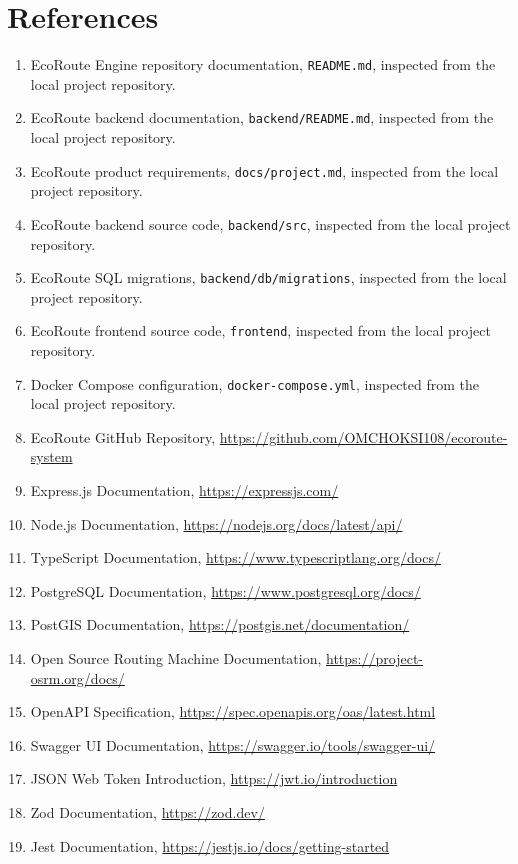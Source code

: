 \documentclass[12pt,a4paper]{report}
\begin{document}
\chapter*{References}
\footnotesize
\begin{enumerate}
\item EcoRoute Engine repository documentation, \texttt{README.md}, inspected from the local project repository.
\item EcoRoute backend documentation, \texttt{backend/README.md}, inspected from the local project repository.
\item EcoRoute product requirements, \texttt{docs/project.md}, inspected from the local project repository.
\item EcoRoute backend source code, \texttt{backend/src}, inspected from the local project repository.
\item EcoRoute SQL migrations, \texttt{backend/db/migrations}, inspected from the local project repository.
\item EcoRoute frontend source code, \texttt{frontend}, inspected from the local project repository.
\item Docker Compose configuration, \texttt{docker-compose.yml}, inspected from the local project repository.
\item EcoRoute GitHub Repository, \url{https://github.com/OMCHOKSI108/ecoroute-system}
\item Express.js Documentation, \url{https://expressjs.com/}
\item Node.js Documentation, \url{https://nodejs.org/docs/latest/api/}
\item TypeScript Documentation, \url{https://www.typescriptlang.org/docs/}
\item PostgreSQL Documentation, \url{https://www.postgresql.org/docs/}
\item PostGIS Documentation, \url{https://postgis.net/documentation/}
\item Open Source Routing Machine Documentation, \url{https://project-osrm.org/docs/}
\item OpenAPI Specification, \url{https://spec.openapis.org/oas/latest.html}
\item Swagger UI Documentation, \url{https://swagger.io/tools/swagger-ui/}
\item JSON Web Token Introduction, \url{https://jwt.io/introduction}
\item Zod Documentation, \url{https://zod.dev/}
\item Jest Documentation, \url{https://jestjs.io/docs/getting-started}

\end{enumerate}
\end{document}
